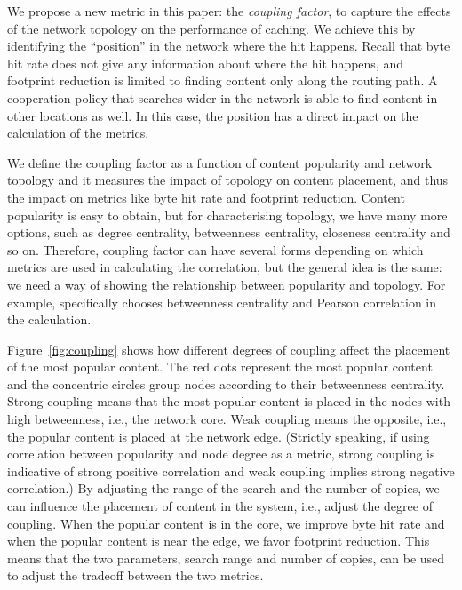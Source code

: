 \documentclass{sigcomm-alternate}
\begin{document}
We propose a new metric in this paper: the \emph{coupling factor}, to capture the effects of the network topology on the performance of caching.
We achieve this by identifying the ``position'' in the network where the hit happens.
Recall that byte hit rate does not give any information about where the hit happens, and footprint reduction is limited to finding content only along the routing path.
A cooperation policy that searches wider in the network is able to find content in other locations as well.
In this case, the position has a direct impact on the calculation of the metrics.



We define the coupling factor as a function of content popularity and network topology and it measures the impact of topology on content placement, and thus the impact on metrics like byte hit rate and footprint reduction.
Content popularity is easy to obtain, but for characterising topology, we have many more options, such as degree centrality, betweenness centrality, closeness centrality and so on.
Therefore, coupling factor can have several forms depending on which metrics are used in calculating the correlation, but the general idea is the same: we need a way of showing the relationship between popularity and topology.
For example, \cite{WangL:Cooperation} specifically chooses betweenness centrality and Pearson correlation in the calculation.

Figure~\ref{fig:coupling} shows how different degrees of coupling affect the placement of the most popular content.
The red dots represent the most popular content and the concentric circles group nodes according to their betweenness centrality.
Strong coupling means that the most popular content is placed in the nodes with high betweenness, i.e., the network core.
Weak coupling means the opposite, i.e., the popular content is placed at the network edge.
(Strictly speaking, if using correlation between popularity and node degree as a metric, strong coupling is indicative of strong positive correlation and weak coupling implies strong negative correlation.)
By adjusting the range of the search and the number of copies, we can influence the placement of content in the system, i.e., adjust the degree of coupling.
When the popular content is in the core, we improve byte hit rate and when the popular content is near the edge, we favor footprint reduction.
This means that the two parameters, search range and number of copies, can be used to adjust the tradeoff between the two metrics.
\end{document}
